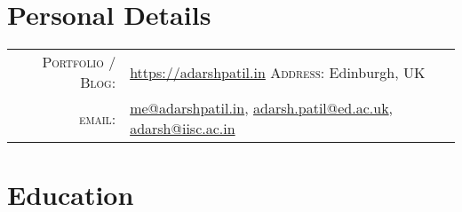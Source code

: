 \documentclass[a4paper,10pt]{article} %
\begin{document}
\pagestyle{empty} %



\par{\bigskip\par} %

\section{Personal Details}

\begin{tabular}{rl}
\textsc{Portfolio / Blog:} & \href{https://adarshpatil.in/timewarp}{https://adarshpatil.in} \hspace{2cm} \textsc{Address:} Edinburgh, UK\\
\textsc{email:} & \href{mailto:me@adarshpatil.in}{me@adarshpatil.in}, \href{mailto:adarsh.patil@ed.ac.uk}{adarsh.patil@ed.ac.uk}, \href{mailto:adarsh@iisc.ac.in}{adarsh@iisc.ac.in}\\
\end{tabular}


\section{Education}
\end{document}

